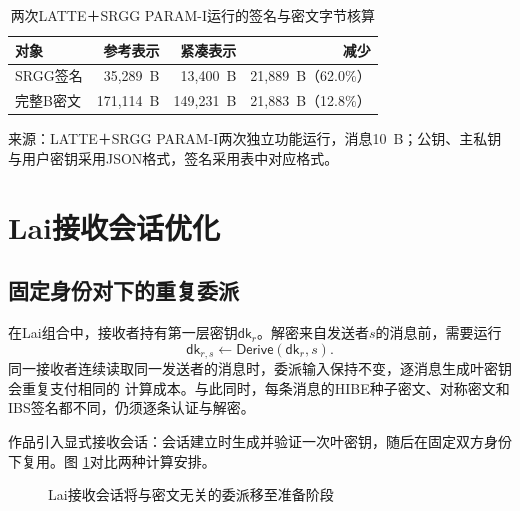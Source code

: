 \begin{table}[H]
\centering\small
\caption{两次LATTE＋SRGG PARAM-I运行的签名与密文字节核算}
\label{tab:srgg-protocol-impact}
\begin{tabular}{@{}lrrr@{}}
\toprule
\rowcolor{black!8} 对象 & 参考表示 & 紧凑表示 & 减少 \\
\midrule
SRGG签名 & 35,289~B & 13,400~B & 21,889~B（62.0\%） \\
完整B密文 & 171,114~B & 149,231~B & 21,883~B（12.8\%） \\
\bottomrule
\end{tabular}
\begin{minipage}{.96\textwidth}\footnotesize
来源：LATTE＋SRGG PARAM-I两次独立功能运行，消息10~B；公钥、主私钥与用户密钥采用JSON格式，签名采用表中对应格式。

\end{minipage}
\end{table}

\section{Lai接收会话优化}
\label{sec:lai-session}

\subsection{固定身份对下的重复委派}

在Lai组合中，接收者持有第一层密钥$\mathsf{dk}_r$。解密来自发送者$s$的消息前，需要运行
\[
 \mathsf{dk}_{r,s}\leftarrow\mathsf{Derive}(\mathsf{dk}_r,s).
\]
同一接收者连续读取同一发送者的消息时，委派输入保持不变，逐消息生成叶密钥会重复支付相同的
计算成本。与此同时，每条消息的HIBE种子密文、对称密文和IBS签名都不同，仍须逐条认证与解密。

作品引入显式接收会话：会话建立时生成并验证一次叶密钥，随后在固定双方身份下复用。图
\ref{fig:receiver-session}对比两种计算安排。

\begin{figure}[H]
\centering
{}
\caption{Lai接收会话将与密文无关的委派移至准备阶段}
\label{fig:receiver-session}
\end{figure}

